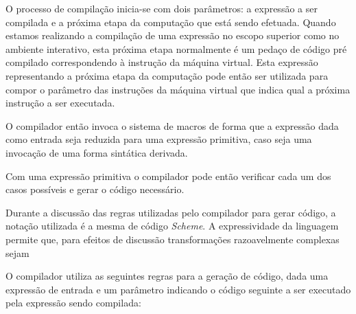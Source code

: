 O processo de compilação inicia-se com dois parâmetros: a expressão a ser
compilada e a próxima etapa da computação que está sendo efetuada. Quando
estamos realizando a compilação de uma expressão no escopo superior como no
ambiente interativo, esta próxima etapa normalmente é um pedaço de código pré
compilado correspondendo à instrução  da máquina virtual. Esta
expressão representando a próxima etapa da computação pode então ser utilizada
para compor o parâmetro das instruções da máquina virtual que indica qual a
próxima instrução a ser executada.

O compilador então invoca o sistema de macros de forma que a expressão dada como
entrada seja reduzida para uma expressão primitiva, caso seja uma invocação de
uma forma sintática derivada.

Com uma expressão primitiva o compilador pode então verificar cada um dos casos
possíveis e gerar o código necessário. 

Durante a discussão das regras utilizadas
pelo compilador para gerar código, a notação utilizada é a mesma de código
\textit{Scheme}. A expressividade da linguagem permite que, para efeitos de 
discussão transformações razoavelmente complexas sejam 


O compilador utiliza as seguintes regras para a geração de código, dada uma 
expressão de entrada e um parâmetro indicando o código seguinte a ser executado
pela expressão sendo compilada:

